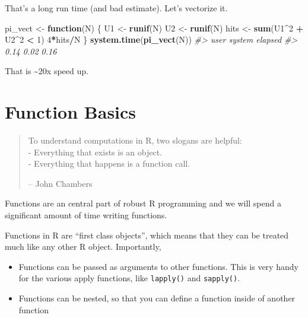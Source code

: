 \documentclass[]{book}
\newenvironment{Shaded}{\begin{snugshade}}{\end{snugshade}}
\newcommand{\KeywordTok}[1]{\textcolor[rgb]{0.13,0.29,0.53}{\textbf{#1}}}
\newcommand{\DecValTok}[1]{\textcolor[rgb]{0.00,0.00,0.81}{#1}}
\newcommand{\StringTok}[1]{\textcolor[rgb]{0.31,0.60,0.02}{#1}}
\newcommand{\CommentTok}[1]{\textcolor[rgb]{0.56,0.35,0.01}{\textit{#1}}}
\newcommand{\ControlFlowTok}[1]{\textcolor[rgb]{0.13,0.29,0.53}{\textbf{#1}}}
\newcommand{\OperatorTok}[1]{\textcolor[rgb]{0.81,0.36,0.00}{\textbf{#1}}}
\newcommand{\NormalTok}[1]{#1}
\theoremstyle{definition}
\theoremstyle{definition}
\theoremstyle{definition}
\theoremstyle{remark}
\begin{document}
That's a long run time (and bad estimate). Let's vectorize it.

\begin{Shaded}
\begin{Highlighting}[]
\NormalTok{pi_vect <-}\StringTok{ }\ControlFlowTok{function}\NormalTok{(N) \{}
\NormalTok{  U1 <-}\StringTok{ }\KeywordTok{runif}\NormalTok{(N)}
\NormalTok{  U2 <-}\StringTok{ }\KeywordTok{runif}\NormalTok{(N)}
\NormalTok{  hits <-}\StringTok{ }\KeywordTok{sum}\NormalTok{(U1}\OperatorTok{^}\DecValTok{2} \OperatorTok{+}\StringTok{ }\NormalTok{U2}\OperatorTok{^}\DecValTok{2} \OperatorTok{<}\StringTok{ }\DecValTok{1}\NormalTok{)}
  \DecValTok{4}\OperatorTok{*}\NormalTok{hits}\OperatorTok{/}\NormalTok{N}
\NormalTok{\}}
\KeywordTok{system.time}\NormalTok{(}\KeywordTok{pi_vect}\NormalTok{(N))}
\CommentTok{#>    user  system elapsed }
\CommentTok{#>    0.14    0.02    0.16}
\end{Highlighting}
\end{Shaded}

That is \textasciitilde{}20x speed up.

\section{Function Basics}\label{function-basics}

\begin{quote}
To understand computations in R, two slogans are helpful:\\
- Everything that exists is an object.\\
- Everything that happens is a function call.

-- John Chambers
\end{quote}

Functions are an central part of robust R programming and we will spend
a significant amount of time writing functions.

Functions in R are ``first class objects'', which means that they can be
treated much like any other R object. Importantly,

\begin{itemize}
\item
  Functions can be passed as arguments to other functions. This is very
  handy for the various apply functions, like \texttt{lapply()} and
  \texttt{sapply()}.
\item
  Functions can be nested, so that you can define a function inside of
  another function
\end{itemize}
\end{document}

